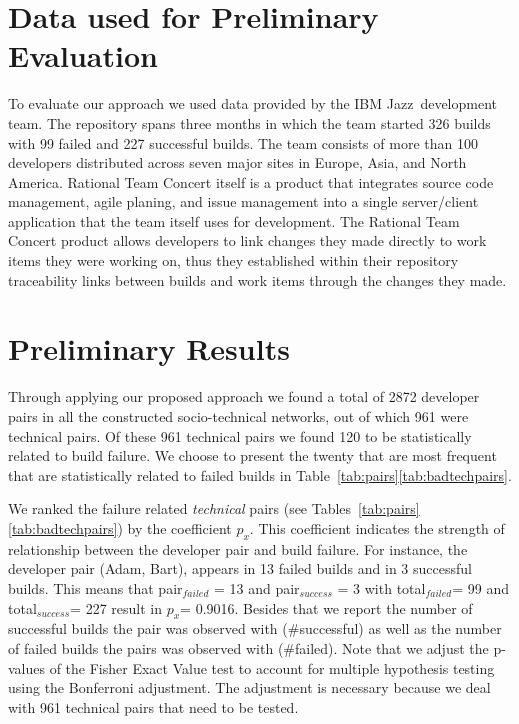 \documentclass[conference]{IEEEtran}
\begin{document}
\section{Data used for Preliminary Evaluation}
To evaluate our approach we used data provided by the IBM Jazz\texttrademark\ development team.
The repository spans three months in which the team started 326 builds with 99 failed and 227 successful builds.
The team consists of more than 100 developers distributed across seven major sites in Europe, Asia, and North America.
Rational Team Concert itself is a product that integrates source code management, agile planing, and issue management into a single server/client application that the team itself uses for development.
The Rational Team Concert product allows developers to link changes they made directly to work items they were working on, thus they established within their repository traceability links between builds and work items through the changes they made.



\section{Preliminary Results}
Through applying our proposed approach we found a total of 2872 developer pairs in all the constructed
socio-technical networks, out of which 961 were technical pairs.
Of these 961 technical pairs we found 120 to be statistically related to build failure. 
We choose to present the twenty that are most frequent that are statistically related to failed builds in Table~\ref{tab:pairs}\ref{tab:badtechpairs}.

We ranked the failure related \emph{technical} pairs (see Tables~\ref{tab:pairs}\ref{tab:badtechpairs})
by the coefficient $p_{x}$. This coefficient indicates the strength of
relationship between the developer pair and build failure. For instance, the
developer pair (Adam, Bart), appears in 13 failed builds and in 3
successful builds. This means that pair$_{failed}$ = 13 and pair$_{success}$ = 3
with total$_{failed}$= 99 and total$_{success}$= 227 result in $p_x$= 0.9016.
Besides that we report the number of successful builds the pair was observed with
(\#successful) as well as the number of failed builds the pairs was observed with
(\#failed). 
Note that we adjust the p-values of the Fisher Exact Value test to account for multiple hypothesis testing using the Bonferroni adjustment.
The adjustment is necessary because we deal with 961 technical pairs that need to be tested. 
\end{document}
